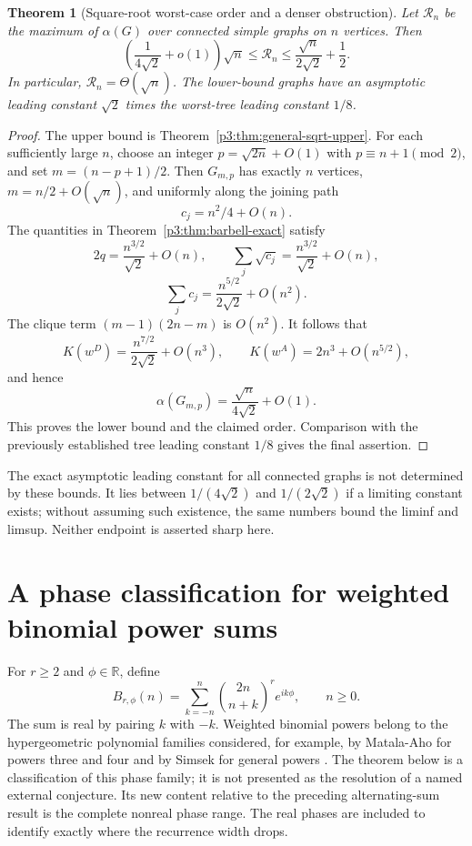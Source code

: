 \documentclass[11pt,a4paper]{article}
\newtheorem{theorem}{Theorem}[section]
\theoremstyle{definition}
\theoremstyle{remark}
\numberwithin{equation}{section}
\begin{document}
\begin{theorem}[Square-root worst-case order and a denser obstruction]
\label{p3:thm:general-sqrt-order}
Let $\mathcal R_n$ be the maximum of $\alpha(G)$ over connected simple
graphs on $n$ vertices.  Then
\begin{equation}\label{p3:eq:general-sandwich}
 \left(\frac1{4\sqrt2}+o(1)\right)\sqrt n
 \leq\mathcal R_n
 \leq\frac{\sqrt n}{2\sqrt2}+\frac12.
\end{equation}
In particular, $\mathcal R_n=\Theta(\sqrt n)$.
The lower-bound graphs have an asymptotic leading constant $\sqrt2$
times the worst-tree leading constant $1/8$.
\end{theorem}

\begin{proof}
The upper bound is Theorem~\ref{p3:thm:general-sqrt-upper}.
For each sufficiently large $n$, choose an integer
$p=\sqrt{2n}+O(1)$ with $p\equiv n+1\pmod2$, and set
$m=(n-p+1)/2$.
Then $G_{m,p}$ has exactly $n$ vertices, $m=n/2+O(\sqrt n)$,
and uniformly along the joining path
\[
 c_j=n^2/4+O(n).
\]
The quantities in Theorem~\ref{p3:thm:barbell-exact} satisfy
\[
 2q=\frac{n^{3/2}}{\sqrt2}+O(n),\qquad
 \sum_j\sqrt{c_j}=\frac{n^{3/2}}{\sqrt2}+O(n),
\]
\[
 \sum_jc_j=\frac{n^{5/2}}{2\sqrt2}+O(n^2).
\]
The clique term $(m-1)(2n-m)$ is $O(n^2)$.
It follows that
\[
 K(w^D)=\frac{n^{7/2}}{2\sqrt2}+O(n^3),\qquad
 K(w^A)=2n^3+O(n^{5/2}),
\]
and hence
\[
 \alpha(G_{m,p})=\frac{\sqrt n}{4\sqrt2}+O(1).
\]
This proves the lower bound and the claimed order.
Comparison with the previously established tree leading constant
$1/8$ gives the final assertion.
\end{proof}

The exact asymptotic leading constant for all connected graphs is
not determined by these bounds.  It lies between $1/(4\sqrt2)$ and
$1/(2\sqrt2)$ if a limiting constant exists; without assuming such
existence, the same numbers bound the liminf and limsup.
Neither endpoint is asserted sharp here.


\section{A phase classification for weighted binomial power sums}
\label{p3:sec:phase-recurrences}

For $r\geq2$ and $\phi\in\mathbb R$, define
\begin{equation}\label{p3:eq:phase-definition}
 B_{r,\phi}(n)=\sum_{k=-n}^{n}\binom{2n}{n+k}^{r}e^{ik\phi},
 \qquad n\geq0.
\end{equation}
The sum is real by pairing $k$ with $-k$. Weighted binomial powers
belong to the hypergeometric polynomial families considered, for
example, by Matala-Aho for powers three and four
\cite{p3:MatalaAho1991} and by Simsek for general powers
\cite{p3:Simsek2019}. The theorem below is a classification of this
phase family; it is not presented as the resolution of a named
external conjecture. Its new content relative to the preceding
alternating-sum result is the complete nonreal phase range. The real
phases are included to identify exactly where the recurrence width
drops.
\end{document}
